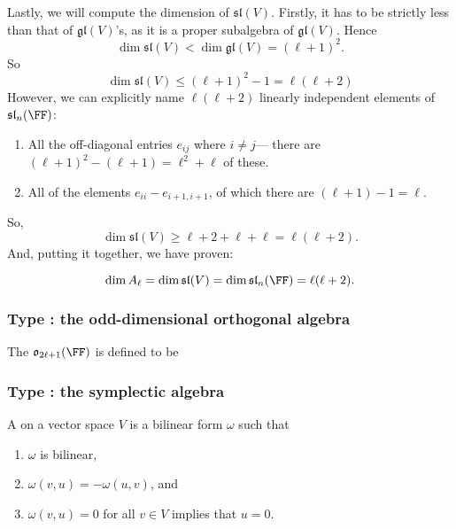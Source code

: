 \documentclass{article}
\newcommand{\glalg}{\ensuremath{\mathfrak{gl}}}
\newcommand{\slalg}{\ensuremath{\mathfrak{sl}}}
\newcommand{\oalg}{\ensuremath{\mathfrak{o}}}
\begin{document}
Lastly, we will compute the dimension of $\slalg(V)$.
Firstly, it has to be strictly less than that of $\glalg(V)$'s, as it is a proper subalgebra of $\glalg(V)$.
Hence
\[
    \dim \slalg(V) < \dim \glalg(V) = (\ell+1)^2.
\]
So
\[
    \dim \slalg(V) \leq (\ell+1)^2 - 1 = \ell(\ell+2)
\]
However, we can explicitly name $\ell(\ell+2)$ linearly independent elements of $\slalg_n(\FF)$:
\begin{enumerate}
    \item 
        All the off-diagonal entries $e_{ij}$ where $i \neq j$--- there are $(\ell+1)^2 - (\ell + 1) = \ell^2 + \ell$ of these.
    \item 
        All of the elements $e_{ii} - e_{i+1,i+1}$, of which there are $(\ell + 1) -1 = \ell$. 
\end{enumerate}
So,
\[
    \dim \slalg(V) \geq \ell+2 + \ell + \ell = \ell(\ell + 2).
\]
And, putting it together, we have proven:
\begin{proposition}
    \[
        \dim A_\ell
        =
        \dim \slalg(V)
        =
        \dim \slalg_n(\FF)
        =
        \ell(\ell+2).
    \]
\end{proposition}

\subsubsection{Type \sfB: the odd-dimensional orthogonal algebra}

\begin{definition}
    The  $\oalg_{2\ell+1}(\FF)$ is defined to be
\end{definition}

\subsubsection{Type \sfC: the symplectic algebra}

\begin{definition}
    A  on a vector space $V$ is a bilinear form $\omega$ such that
    \begin{enumerate}[label=(\alph*)]
        \item
            $\omega$ is bilinear,
        \item 
            $\omega(v,u) = -\omega(u,v)$, and
        \item 
            $\omega(v,u) = 0$ for all $v \in V$ implies that $u=0$.
    \end{enumerate}
\end{definition}
\end{document}
